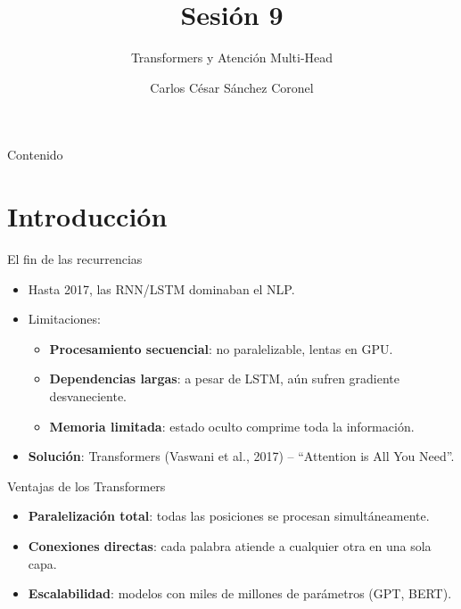 \documentclass[aspectratio=169, 10pt, xcolor=table]{beamer}
\title[SESIÓN 9 NLP]{\textbf{Sesión 9}}
\subtitle{Transformers y Atención Multi-Head}
\author[Prof. C. Sánchez]{Carlos César Sánchez Coronel}
\institute{\textbf{NLP}}
\date{}
\begin{document}
\begin{frame}
    \titlepage
\end{frame}

\begin{frame}{Contenido}
    \tableofcontents
\end{frame}

\section{Introducción}

\begin{frame}{El fin de las recurrencias}
    \begin{itemize}
        \item Hasta 2017, las RNN/LSTM dominaban el NLP.
        \item Limitaciones:
        \begin{itemize}
            \item \textbf{Procesamiento secuencial}: no paralelizable, lentas en GPU.
            \item \textbf{Dependencias largas}: a pesar de LSTM, aún sufren gradiente desvaneciente.
            \item \textbf{Memoria limitada}: estado oculto comprime toda la información.
        \end{itemize}
        \item \textbf{Solución}: Transformers (Vaswani et al., 2017) – ``Attention is All You Need''.
    \end{itemize}
\end{frame}

\begin{frame}{Ventajas de los Transformers}
    \begin{itemize}
        \item \textbf{Paralelización total}: todas las posiciones se procesan simultáneamente.
        \item \textbf{Conexiones directas}: cada palabra atiende a cualquier otra en una sola capa.
        \item \textbf{Escalabilidad}: modelos con miles de millones de parámetros (GPT, BERT).
    \end{itemize}
\end{frame}
\end{document}
